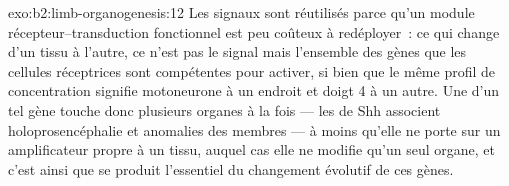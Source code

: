 \begin{solution}{exo:b2:limb-organogenesis:12}
Les signaux sont réutilisés parce qu'un module récepteur--transduction
fonctionnel est peu coûteux à redéployer~: ce qui change d'un tissu à
l'autre, ce n'est pas le signal mais l'ensemble des gènes que les
cellules réceptrices sont compétentes pour activer, si bien que le même
profil de concentration signifie motoneurone à un endroit et doigt 4 à
un autre. Une  d'un tel gène touche donc plusieurs organes à la
fois --- les  de Shh associent holoprosencéphalie et anomalies
des membres --- à moins qu'elle ne porte sur un amplificateur propre à un
tissu, auquel cas elle ne modifie qu'un seul organe, et c'est ainsi que
se produit l'essentiel du changement évolutif de ces gènes.
\end{solution}

